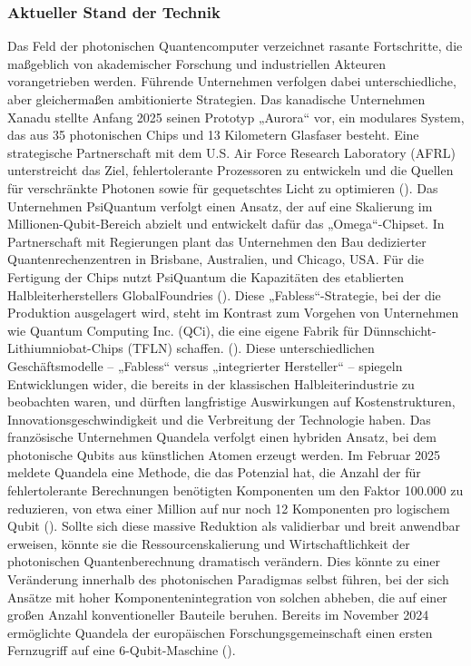 \subsubsection{Aktueller Stand der Technik}
Das Feld der photonischen Quantencomputer verzeichnet rasante Fortschritte, die maßgeblich von akademischer Forschung und industriellen Akteuren vorangetrieben werden. Führende Unternehmen verfolgen dabei unterschiedliche, aber gleichermaßen ambitionierte Strategien.
Das kanadische Unternehmen Xanadu stellte Anfang 2025 seinen Prototyp „Aurora“ vor, ein modulares System, das aus 35 photonischen Chips und 13 Kilometern Glasfaser besteht. Eine strategische Partnerschaft mit dem U.S. Air Force Research Laboratory (AFRL) unterstreicht das Ziel, fehlertolerante Prozessoren zu entwickeln und die Quellen für verschränkte Photonen sowie für gequetschtes Licht zu optimieren (\cite{kareemXanaduUSAir2025}).
Das Unternehmen PsiQuantum verfolgt einen Ansatz, der auf eine Skalierung im Millionen-Qubit-Bereich abzielt und entwickelt dafür das „Omega“-Chipset. In Partnerschaft mit Regierungen plant das Unternehmen den Bau dedizierter Quantenrechenzentren in Brisbane, Australien, und Chicago, USA. Für die Fertigung der Chips nutzt PsiQuantum die Kapazitäten des etablierten Halbleiterherstellers GlobalFoundries (\cite{DARPAEyesCompanies}). Diese „Fabless“-Strategie, bei der die Produktion ausgelagert wird, steht im Kontrast zum Vorgehen von Unternehmen wie Quantum Computing Inc. (QCi), die eine eigene Fabrik für Dünnschicht-Lithiumniobat-Chips (TFLN) schaffen. (\cite{QuantumComputingInc}). Diese unterschiedlichen Geschäftsmodelle – „Fabless“ versus „integrierter Hersteller“ – spiegeln Entwicklungen wider, die bereits in der klassischen Halbleiterindustrie zu beobachten waren, und dürften langfristige Auswirkungen auf Kostenstrukturen, Innovationsgeschwindigkeit und die Verbreitung der Technologie haben. \newline
Das französische Unternehmen Quandela verfolgt einen hybriden Ansatz, bei dem photonische Qubits aus künstlichen Atomen erzeugt werden. Im Februar 2025 meldete Quandela eine Methode, die das Potenzial hat, die Anzahl der für fehlertolerante Berechnungen benötigten Komponenten um den Faktor 100.000 zu reduzieren, von etwa einer Million auf nur noch 12 Komponenten pro logischem Qubit (\cite{QuandelaAnnounces100000fold2025}). Sollte sich diese massive Reduktion als validierbar und breit anwendbar erweisen, könnte sie die Ressourcenskalierung und Wirtschaftlichkeit der photonischen Quantenberechnung dramatisch verändern. Dies könnte zu einer Veränderung innerhalb des photonischen Paradigmas selbst führen, bei der sich Ansätze mit hoher Komponentenintegration von solchen abheben, die auf einer großen Anzahl konventioneller Bauteile beruhen. Bereits im November 2024 ermöglichte Quandela der europäischen Forschungsgemeinschaft einen ersten Fernzugriff auf eine 6-Qubit-Maschine (\cite{QuandelaAnnounces100000fold2025}). \newline
